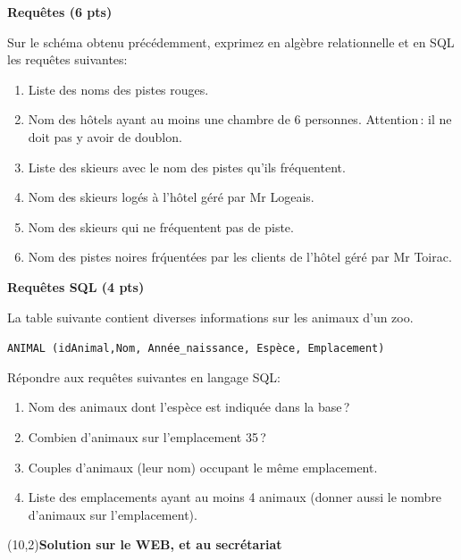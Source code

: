 \documentclass{article}
\begin{document}
\smallskip
{\bf Requ\^etes ({\bf 6 pts})}

Sur le sch\'ema obtenu pr\'ec\'edemment, exprimez
en alg\`ebre relationnelle et en SQL les requ\^etes suivantes:

\begin{enumerate}
  \item Liste des noms des pistes rouges.

  \item Nom des h\^otels ayant au moins une chambre de 6 personnes.
        Attention\,: il ne doit pas y avoir de doublon.

  \item Liste des skieurs avec le nom des pistes qu'ils fr\'equentent.

  \item Nom des skieurs log\'es \`a l'h\^otel g\'er\'e
        par Mr Logeais.

  \item Nom des skieurs qui ne fr\'equentent pas de piste.

  \item  Nom des pistes noires fr\'quent\'ees par les clients
        de l'h\^otel g\'er\'e par Mr Toirac.
\end{enumerate}

\smallskip
{\bf Requ\^etes SQL ({\bf 4 pts})}
 
La table suivante contient diverses informations sur
les animaux d'un zoo.

\begin{center} 
{\tt   ANIMAL (idAnimal,Nom, Ann\'ee\_naissance, Esp\`ece, Emplacement)}
\end{center}

R\'epondre aux requ\^etes suivantes
en langage SQL:

\begin{enumerate}
  
  \item Nom des animaux dont l'esp\`ece est indiqu\'ee
       dans la base\,?

  \item Combien d'animaux sur l'emplacement 35\,?

  \item Couples d'animaux (leur nom) occupant le m\^eme emplacement.

   \item Liste des emplacements ayant au moins 4 animaux
     (donner aussi le nombre d'animaux sur l'emplacement).
\end{enumerate}

\begin{center}

\framebox(10,2){{\bf Solution sur le WEB, et au secr\'etariat}}
\end{center}
\end{document}
